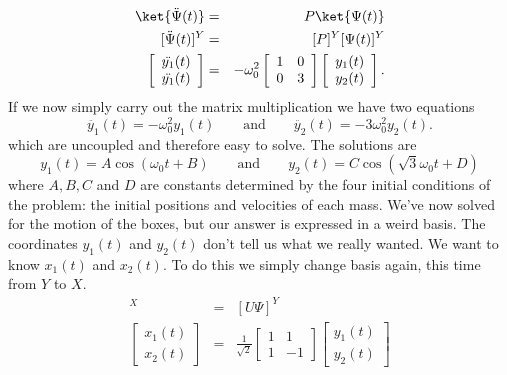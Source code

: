 \begin{eqnarray*}
\ket{\ddot{\Psi}(t)} &=& P \ket{\Psi(t)} \\
\lbrack \ddot{\Psi}(t) \rbrack ^Y &=& \lbrack P \rbrack ^Y \lbrack \Psi (t) \rbrack ^Y \\ %
\left[ \begin{array}{c} \ddot{y_1}(t) \\ \ddot{y_1}(t) \end{array} \right] 
&=& -\omega _{0}^{2} \left[ \begin{array}{cc} 1&0 \\ 0&3 \end{array} \right] 
\left[ \begin{array}{c} y_1(t) \\ y_2(t) \end{array} \right].
\end{eqnarray*}
If we now simply carry out the matrix multiplication we have two equations
\begin{displaymath} \ddot{y_1}(t) = -\omega _{0}^{2} y_1(t) \qquad \textrm{and} \qquad \ddot{y_2}(t) = -3\omega _{0}^{2} y_2(t).\end{displaymath}
which are uncoupled and therefore easy to solve.  The solutions are
\begin{displaymath} y_1(t) = A \cos(\omega _{0} t + B) \qquad \textrm{and} \qquad y_2(t) = C\cos(\sqrt{3}\omega _{0} t + D) \end{displaymath}
where $A,B,C$ and $D$ are constants determined by the four initial conditions of the problem: the initial positions and velocities of each mass.  We've now solved for the motion of the boxes, but our answer is expressed in a weird basis.  The coordinates $y_1(t)$ and $y_2(t)$ don't tell us what we really wanted.  We want to know $x_1(t)$ and $x_2(t)$.  To do this we simply change basis again, this time from $Y$ to $X$.
\begin{eqnarray*}
[\Psi]^{X} &=& [U\Psi]^{Y}\\
\left[ \begin{array}{c} x_1(t)\\x_2(t) \end{array} \right] &=& 
\frac{1}{\sqrt{2}}\left[ \begin{array}{cc} 1&1\\1&-1 \end{array} \right] \left[\begin{array}{c} y_1(t)\\y_2(t) \end{array} \right]
\end{eqnarray*}
